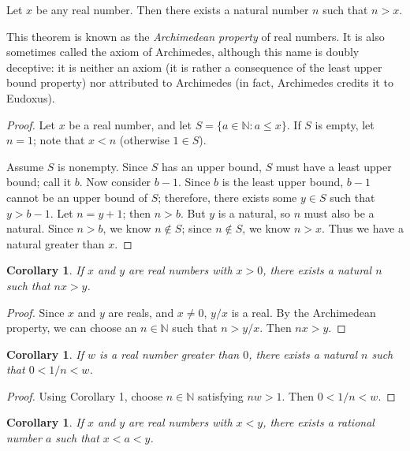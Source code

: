 \documentclass[12pt]{article}
\newtheorem{corollary}[theorem]{Corollary}
\begin{document}
\theoremstyle{definition}

Let $x$ be any real number.  Then there exists a natural number $n$ such that $n > x$.

This theorem is known as the \emph{Archimedean property} of real numbers.  It is also sometimes called the axiom of Archimedes, although this name is doubly deceptive: it is neither an axiom (it is rather a consequence of the least upper bound property) nor attributed to Archimedes (in fact, Archimedes credits it to Eudoxus).

\begin{proof}
Let $x$ be a real number, and let $S = \{ a \in \mathbb{N} : a \leq x \}$.  If $S$ is empty, let $n = 1$; note that $x < n$ (otherwise $1 \in S$).

Assume $S$ is nonempty.  Since $S$ has an upper bound, $S$ must have a least upper bound; call it $b$.  Now consider $b - 1$.  Since $b$ is the least upper bound, $b - 1$ cannot be an upper bound of $S$; therefore, there exists some $y \in S$ such that $y > b - 1$.  Let $n = y + 1$; then $n > b$.  But $y$ is a natural, so $n$ must also be a natural.  Since $n > b$, we know $n \not\in S$; since $n \not\in S$, we know $n > x$.  Thus we have a natural greater than $x$.
\end{proof}

\begin{corollary}
If $x$ and $y$ are real numbers with $x > 0$, there exists a natural $n$ such that $nx > y$.
\end{corollary}

\begin{proof}
Since $x$ and $y$ are reals, and $x \neq 0$, $y/x$ is a real.  By the Archimedean property, we can choose an $n \in \mathbb{N}$ such that $n > y/x$.  Then $nx > y$.
\end{proof}

\begin{corollary}
If $w$ is a real number greater than $0$, there exists a natural $n$ such that $0 < 1/n < w$.
\end{corollary}

\begin{proof}
Using Corollary 1, choose $n \in \mathbb{N}$ satisfying $nw > 1$.  Then $0 < 1/n < w$.
\end{proof}

\begin{corollary}
If $x$ and $y$ are real numbers with $x < y$, there exists a rational number $a$ such that $x < a < y$.
\end{corollary}
\end{document}
